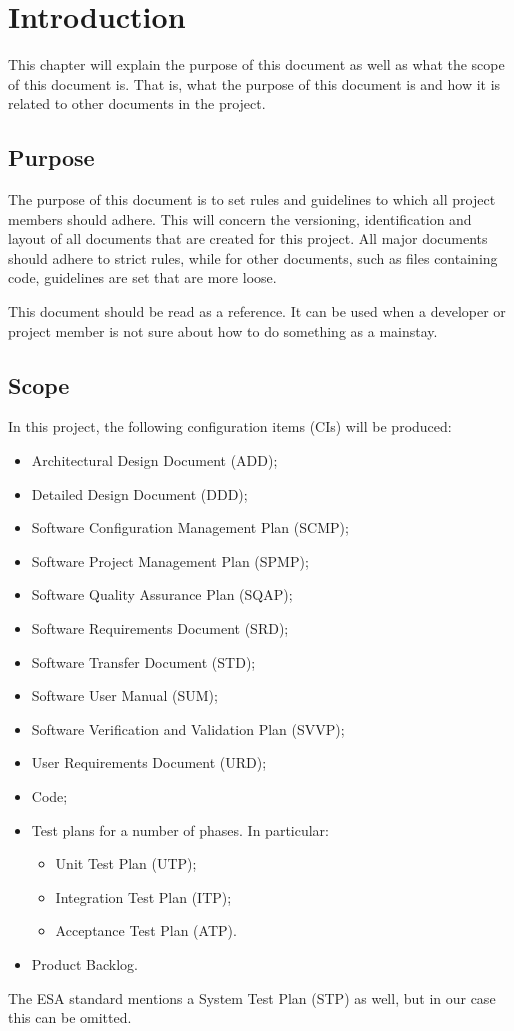 \chapter{Introduction}
\label{chap:introduction}
This chapter will explain the purpose of this document as well as what the scope of this document is. That is, what the purpose of this document is and how it is related to other documents in the project.

\section{Purpose}
The purpose of this document is to set rules and guidelines to which all project members should adhere. This will concern the versioning, identification and layout of all documents that are created for this project. All major documents should adhere to strict rules, while for other documents, such as files containing code, guidelines are set that are more loose.

This document should be read as a reference. It can be used when a developer or project member is not sure about how to do something as a mainstay.

\section{Scope}
In this project, the following configuration items (CIs) will be produced:
\begin{itemize}
	\item Architectural Design Document (ADD);
	\item Detailed Design Document (DDD);
	\item Software Configuration Management Plan (SCMP);
	\item Software Project Management Plan (SPMP);
	\item Software Quality Assurance Plan (SQAP);
	\item Software Requirements Document (SRD);
	\item Software Transfer Document (STD);
	\item Software User Manual (SUM);
	\item Software Verification and Validation Plan (SVVP);
	\item User Requirements Document (URD);
	\item Code;
	\item Test plans for a number of phases. In particular:
	\begin{itemize}
		\item Unit Test Plan (UTP);
		\item Integration Test Plan (ITP);
		\item Acceptance Test Plan (ATP).
	\end{itemize}
	\item Product Backlog.
\end{itemize}
The ESA standard mentions a System Test Plan (STP) as well, but in our case this can be omitted.

